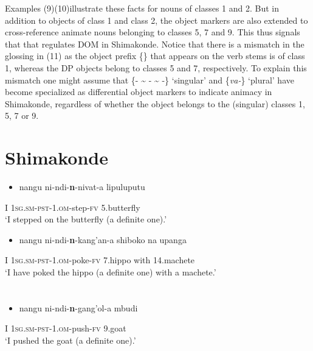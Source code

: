 \documentclass[output=paper]{langsci/langscibook}
\begin{document}
Examples (9)(10)\textstyleFontepargpadroi{ }illustrate these facts for nouns of classes 1 and 2. But in addition to objects of class 1 and class 2, the object markers are also extended to cross-reference animate nouns belonging to classes 5, 7 and 9. This thus signals that that regulates DOM in Shimakonde. Notice that there is a mismatch in the glossing in (11) as the object prefix  \{\} that appears on the verb stems is of class 1, whereas the DP objects belong to classes 5 and 7, respectively. To explain this mismatch one might assume that \{- {\textasciitilde} - {\textasciitilde} -\} ‘singular’ and \{\textit{va-}\} ‘plural’ have become specialized as differential object markers to indicate animacy in Shimakonde, regardless of whether the object belongs to the (singular) classes 1, 5, 7 or 9.

\chapter[Shimakonde]{Shimakonde}
\label{bkm:Ref455884562}\setcounter{itemize}{0}
\begin{itemize}
\item \gll nangu        ni-ndi-\textbf{n}{}-nivat-a                           lipuluputu\\
\end{itemize}
     I                \textsc{1sg.sm-pst-1.om}{}-step-\textsc{fv}            5.butterfly\\
\glt ‘I stepped on the butterfly (a definite one).’
\z

\begin{itemize}
\item \gll nangu         ni-ndi-\textbf{n}{}-kang'an-a                     shiboko           na       upanga\\
\end{itemize}
     I                 \textsc{1sg.sm-pst-1.om}{}-poke-\textsc{fv}         7.hippo            with   14.machete\\
\glt ‘I have poked the hippo (a definite one) with a machete.’
\z

\chapter[]{\rmfamily }
\begin{itemize}
\item \gll nangu         ni-ndi-\textbf{n}{}-gang'ol-a                      mbudi\\
\end{itemize}
     I                 \textsc{1sg.sm-pst-1.om}{}-push-\textsc{fv}          9.goat\\
\glt ‘I pushed the goat (a definite one).’
\z
\end{document}
